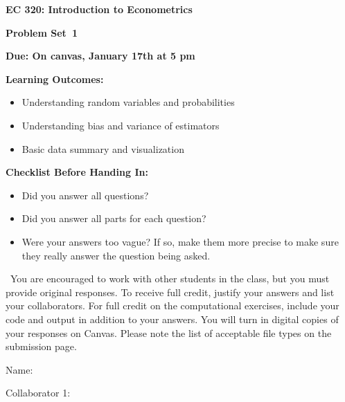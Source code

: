 \documentclass[11pt]{article}
\begin{document}
\begin{onehalfspacing}

\begin{center}
\textbf{EC 320: Introduction to Econometrics} \bigskip

\textbf{Problem Set\bigskip\ 1}
\bigskip
\end{center}



\noindent \textbf{Due: On canvas, January 17th at 5 pm}

\bigskip

\noindent \textbf{Learning Outcomes:}
\begin{itemize}
\item Understanding random variables and probabilities  
\item Understanding bias and variance of estimators 
\item Basic data summary and visualization
\end{itemize}

\bigskip


\noindent \textbf{Checklist Before Handing In:}
\begin{itemize}
\item Did you answer all questions?
\item Did you answer all parts for each question?
\item Were your answers too vague? If so, make them more precise to make sure they really answer the question being asked.
\end{itemize}

\bigskip

\ You are encouraged to work with other students in the class, but you must provide original responses. To receive full credit, justify your answers and list your collaborators. For full credit on the computational exercises, include your code and output in addition to your answers. You will turn in digital copies of your responses on Canvas. Please note the list of acceptable file types on the submission page.  \\
\vspace{0.1in}

Name: 			\\
\vspace{0.1in}

Collaborator 1: \\

\vspace{0.1in}


\end{onehalfspacing}
\end{document}
